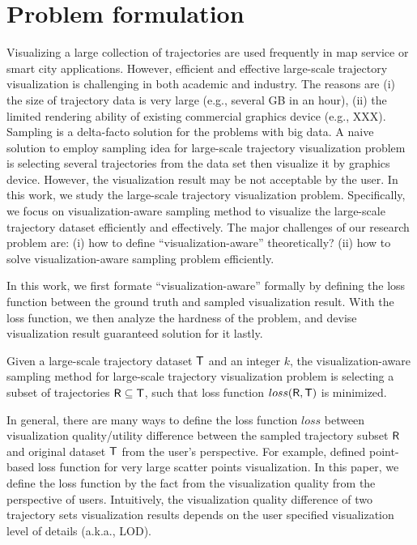 \section{Problem formulation}
Visualizing a large collection of trajectories are used frequently in map service or smart city applications.
However, efficient and effective large-scale trajectory visualization is challenging in both academic and industry.
The reasons are (i) the size of trajectory data is very large (e.g., several GB in an hour),
(ii) the limited rendering ability of existing commercial graphics device (e.g., XXX).
Sampling is a delta-facto solution for the problems with big data.
A naive solution to employ sampling idea for large-scale trajectory visualization problem is
selecting several trajectories from the data set then visualize it by graphics device.
However, the visualization result may be not acceptable by the user.
In this work, we study the large-scale trajectory visualization problem.
Specifically, we focus on visualization-aware sampling method to visualize the large-scale trajectory dataset efficiently and effectively.
The major challenges of our research problem are:
(i) how to define ``visualization-aware'' theoretically?
(ii) how to solve visualization-aware sampling problem efficiently.

In this work, we first formate ``visualization-aware'' formally by defining the loss function between the ground truth and sampled visualization result.
With the loss function, we then analyze the hardness of the problem, and devise visualization result guaranteed solution for it lastly.


\begin{problem}\label{prob:def}
Given a large-scale trajectory dataset $\mathsf{T}$ and an integer $k$,
the visualization-aware sampling method for large-scale trajectory visualization problem is selecting a subset of trajectories $\mathsf{R} \subseteq \mathsf{T}$,
such that loss function $loss(\mathsf{R},\mathsf{T})$ is minimized.
\end{problem}


In general, there are many ways to define the loss function $loss$ between visualization quality/utility difference between the sampled trajectory subset $\mathsf{R}$ and original dataset $\mathsf{T}$ from the user’s perspective.
For example, \cite{park2016visualization} defined point-based loss function for very large scatter points visualization.
In this paper, we define the loss function by the fact from the visualization quality from the perspective of users.
Intuitively, the visualization quality difference of two trajectory sets visualization results depends on the user specified visualization level of details (a.k.a., LOD).

